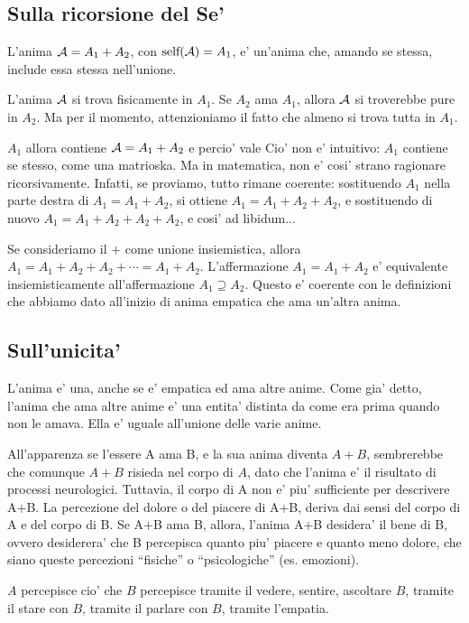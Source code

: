 \subsection{Sulla ricorsione del Se'}
\label{ricorsioneSe}

L'anima $\mathcal{A}=A_1+A_2$, con $\textrm{self}(\mathcal{A})=A_1$, e' un'anima che, amando se stessa, include essa stessa nell'unione. 

L'anima $\mathcal{A}$ si trova fisicamente in $A_1$. Se $A_2$ ama $A_1$, allora $\mathcal{A}$ si troverebbe pure in $A_2$. Ma per il momento, attenzioniamo il fatto che almeno si trova tutta in $A_1$.

$A_1$ allora contiene $\mathcal{A}=A_1+A_2$ e percio' vale 
Cio' non e' intuitivo: $A_1$ contiene se stesso, come una matrioska. Ma in matematica, non e' cosi' strano ragionare ricorsivamente. Infatti, se proviamo, tutto rimane coerente: sostituendo $A_1$ nella parte destra di $A_1=A_1+A_2$, si ottiene $A_1=A_1+A_2+A_2$, e sostituendo di nuovo $A_1=A_1+A_2+A_2+A_2$, e cosi' ad libidum...

Se consideriamo il $+$ come unione insiemistica, allora $A_1=A_1+A_2+A_2+\cdots = A_1+A_2$. L'affermazione $A_1=A_1+A_2$ e' equivalente insiemisticamente all'affermazione $A_1 \supseteq A_2$. Questo e' coerente con le definizioni che abbiamo dato all'inizio di anima empatica che ama un'altra anima.

\subsection{Sull'unicita'}

L'anima e' una, anche se e' empatica ed ama altre anime. Come gia' detto, l'anima che ama altre anime e' una entita' distinta da come era prima quando non le amava. Ella e' uguale all'unione delle varie anime. 

All'apparenza se l'essere A ama B, e la sua anima diventa $A+B$, sembrerebbe che comunque $A+B$ risieda nel corpo di $A$, dato che l'anima e' il risultato di processi neurologici. Tuttavia, il corpo di A non e' piu' sufficiente per descrivere A+B. La percezione del dolore o del piacere di A+B, deriva dai sensi del corpo di A e del corpo di B. Se A+B ama B, allora, l'anima A+B desidera' il bene di B, ovvero desiderera' che B percepisca quanto piu' piacere e quanto meno dolore, che siano queste percezioni ``fisiche'' o ``psicologiche'' (es. emozioni). 

$A$ percepisce cio' che  $B$ percepisce tramite il vedere, sentire, ascoltare $B$, tramite il stare con $B$, tramite il parlare con $B$, tramite l'empatia.

